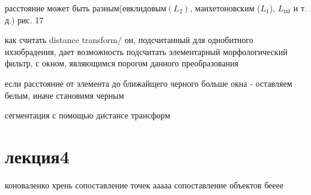 \documentclass[]{report}
\begin{document}
расстояние может быть разным(евклидовым$(L_2)$, манхетоновским ($L_1$), $L_{\inf}$ и т. д.)
рис. 17

как считать distance transform/
он, подсчитанный для однобитного ихзобрадения, дает возможность подсчитать элементарный морфологический фильтр, с окном, являющимся порогом данного преобразования


если расстояние от элемента до ближайщего черного больше окна - оставляем белым, иначе становимя черным

сегментация с помощью дистансе трансформ


\chapter{лекция4}

коноваленко
хрень
сопоставление точек
ааааа
сопоставление объектов
бееее
\end{document}
